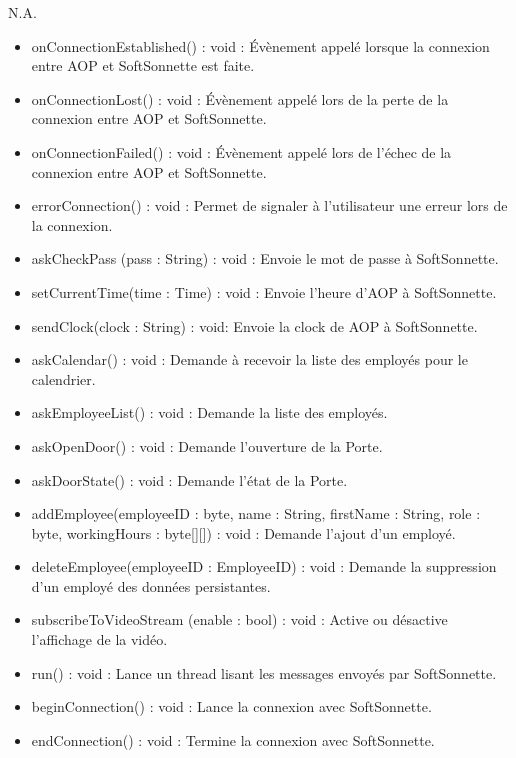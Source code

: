             N.A.
            \begin{itemize}
                \item {onConnectionEstablished() : void : Évènement appelé lorsque la connexion entre AOP et SoftSonnette est faite.} 
                \item {onConnectionLost() : void : Évènement appelé lors de la perte de la connexion entre AOP et SoftSonnette.} 
                \item {onConnectionFailed() : void : Évènement appelé lors de l'échec de la connexion entre AOP et SoftSonnette.}
                \item {errorConnection() : void : Permet de signaler à l’utilisateur une erreur lors de la connexion.}
                \item {askCheckPass (pass : String) : void : Envoie le mot de passe à SoftSonnette.}
                \item {setCurrentTime(time : Time) : void : Envoie l'heure d'AOP à SoftSonnette.}
                \item {sendClock(clock : String) : void: Envoie la clock de AOP à SoftSonnette.}
                \item {askCalendar() : void : Demande à recevoir la liste des employés pour le calendrier.}
                \item {askEmployeeList() : void : Demande la liste des employés.}
                \item {askOpenDoor() : void : Demande l’ouverture de la Porte.}
                \item {askDoorState() : void : Demande l'état de la Porte.}
                \item {addEmployee(employeeID : byte, name : String, firstName : String, role : byte, workingHours : byte[][]) : void : Demande l'ajout d'un employé.}
                \item {deleteEmployee(employeeID : EmployeeID) : void : Demande la suppression d'un employé des données persistantes.}
                \item {subscribeToVideoStream (enable : bool) : void : Active ou désactive l'affichage de la vidéo.}
                \item {run() : void : Lance un thread lisant les messages envoyés par SoftSonnette.}
                \item {beginConnection() : void : Lance la connexion avec SoftSonnette.} 
                \item {endConnection() : void : Termine la connexion avec SoftSonnette.} 
            \end{itemize} 
            \newpage

